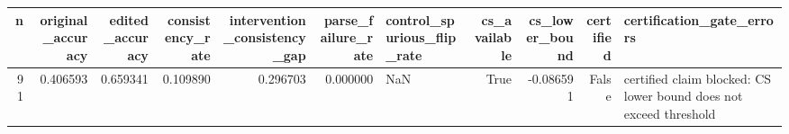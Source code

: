\begin{tabular}{rrrrrrlrrrl}
\toprule
n & original_accuracy & edited_accuracy & consistency_rate & intervention_consistency_gap & parse_failure_rate & control_spurious_flip_rate & cs_available & cs_lower_bound & certified & certification_gate_errors \\
\midrule
91 & 0.406593 & 0.659341 & 0.109890 & 0.296703 & 0.000000 & NaN & True & -0.086591 & False & certified claim blocked: CS lower bound does not exceed threshold \\
\bottomrule
\end{tabular}
